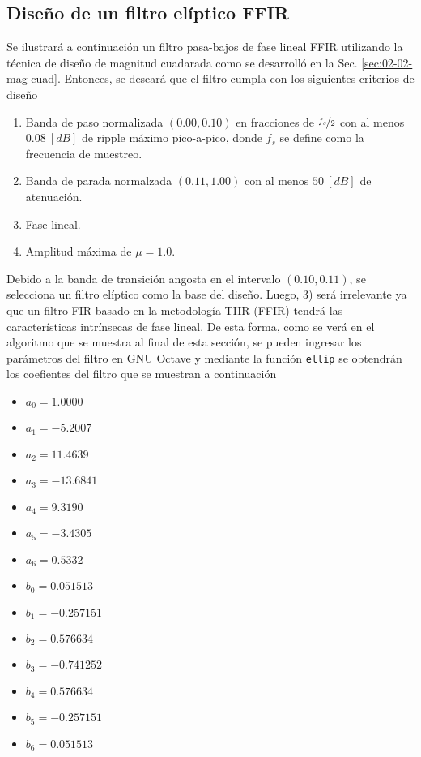 \subsection{Diseño de un filtro elíptico FFIR}
    Se ilustrará a continuación un filtro pasa-bajos de fase lineal FFIR utilizando la técnica de diseño de magnitud cuadarada como se desarrolló en la Sec. \ref{sec:02-02-mag-cuad}. Entonces, se deseará que el filtro cumpla con los siguientes criterios de diseño

    \begin{enumerate}
      \item Banda de paso normalizada $(0.00,0.10)$ en fracciones de $\nicefrac{f_{s}}{2}$ con al menos $0.08 \: [\unit{dB}]$ de ripple máximo pico-a-pico, donde $f_{s}$ se define como la frecuencia de muestreo.
      \item Banda de parada normalzada $(0.11,1.00)$ con al menos $50 \: [\unit{dB}]$ de atenuación.
      \item Fase lineal.
      \item Amplitud máxima de $\mu = 1.0$.
    \end{enumerate}

    Debido a la banda de transición angosta en el intervalo $(0.10,0.11)$, se selecciona un filtro elíptico como la base del diseño. Luego, 3) será irrelevante ya que un filtro FIR basado en la metodología TIIR (FFIR) tendrá las características intrínsecas de fase lineal. De esta forma, como se verá en el algoritmo que se muestra al final de esta sección, se pueden ingresar los parámetros del filtro en GNU Octave y mediante la función \lstinline|ellip| se obtendrán los coefientes del filtro que se muestran a continuación

    \begin{itemize}
      \item $a_{0} = 1.0000$
      \item $a_{1} = -5.2007$
      \item $a_{2} = 11.4639$
      \item $a_{3} = -13.6841$
      \item $a_{4} = 9.3190$
      \item $a_{5} = -3.4305$
      \item $a_{6} = 0.5332$
    \end{itemize}

    \begin{itemize}
      \item $b_{0} = 0.051513$
      \item $b_{1} = -0.257151$
      \item $b_{2} = 0.576634$
      \item $b_{3} = -0.741252$
      \item $b_{4} = 0.576634$
      \item $b_{5} = -0.257151$
      \item $b_{6} = 0.051513$
    \end{itemize}

